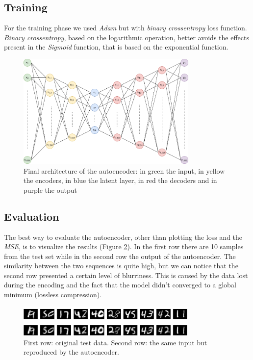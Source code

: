 \documentclass[compsoc]{IEEEtran}
\begin{document}
\subsection{Training}\label{sec:autotrain}
For the training phase we used \emph{Adam} but with \emph{binary crossentropy} loss function. \emph{Binary crossentropy}, based on the logarithmic operation, 
better avoids the effects present in the \emph{Sigmoid} function, that is based on the exponential function.

\begin{figure}[ht!]
\centering                                                                        
\includegraphics[width=3.5in]{auto.png}
\captionsetup{justification=centering}
\caption{Final architecture of the autoencoder: in green the input, in yellow the encoders, in blue the latent layer, in red the decoders and in purple the output}
\label{fig:auto}
\end{figure}

\subsection{Evaluation}
The best way to evaluate the autoencoder, other than plotting the loss and the \emph{MSE}, is to visualize the results (Figure \ref{fig:reproduce}). In the first row
there are 10 samples from the test set while in the second row the output of the autoencoder. The similarity between the two sequences is quite high, but we
can notice that the second row presented a certain level of blurriness. This is caused by the data lost during the encoding and the fact that the model didn't  converged to a global minimum (lossless compression).


\begin{figure}[ht!]
\centering                                                                        
\includegraphics[width=3.5in]{reproduce.png}
\captionsetup{justification=centering}
\caption{First row: original test data. Second row: the same input but reproduced by the autoencoder.}
\label{fig:reproduce}
\end{figure}
\end{document}
